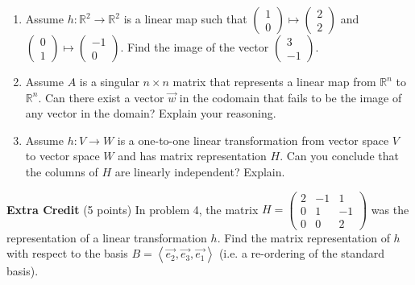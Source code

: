 \documentclass[12pt]{article}
\newcommand{\bpm}{\begin{pmatrix}}
\newcommand{\epm}{\end{pmatrix}}
\begin{document}
\begin{enumerate}
\begin{enumerate}
	\item Assume $h: \mathbb{R}^2 \to \mathbb{R}^2$ is a linear map such that $\bpm 1\\0 \epm \mapsto \bpm 2\\2\epm$ and  $\bpm 0\\1 \epm \mapsto \bpm -1\\0\epm.$ Find the image of  the vector $\bpm 3\\-1 \epm.$
	\vfill
	\item Assume $A$ is a singular $n \times n$ matrix that represents a linear map from $\mathbb{R}^n$ to  $\mathbb{R}^n.$ Can there exist a vector $\vec{w}$ in the codomain that fails to be the image of any vector in the domain? Explain your reasoning.
	\vfill
	\item Assume $h: V \to W$ is a one-to-one linear transformation from vector space $V$ to vector space $W$ and has matrix representation $H.$ Can you conclude that the columns of $H$ are linearly independent? Explain. 
	\vfill
	\end{enumerate}
	
\end{enumerate}
\newpage
\textbf{Extra Credit} (5 points) In problem 4, the matrix $H=\bpm 2&-1&1\\0&1&-1\\0&0&2 \epm$  was the representation of a linear transformation $h.$ Find the matrix representation of $h$ with respect to the basis $B=\left \langle \vec{e_2},  \vec{e_3},  \vec{e_1} \right \rangle$ (i.e. a re-ordering of the standard basis). 
\end{document}
